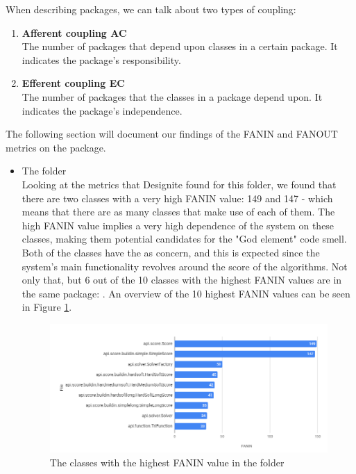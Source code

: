     When describing packages, we can talk about two types of coupling:
    \begin{enumerate}
        \item \textbf{Afferent coupling AC}\\
        The number of packages that depend upon classes in a certain package. It indicates the package's responsibility.
        \item \textbf{Efferent coupling EC}\\
        The number of packages that the classes in a package depend upon. It indicates the package's independence.
    \end{enumerate}
    The following section will document our findings of the FANIN and FANOUT metrics on the  package.
    
    \begin{itemize}
        \item The  folder\\
        Looking at the metrics that Designite found for this folder, we found that there are two classes with a very high FANIN value: 149 and 147 - which means that there are as many classes that make use of each of them. The high FANIN value implies a very high dependence of the system on these classes, making them potential candidates for the "God element" code smell. Both of the classes have the  as concern, and this is expected since the system's main functionality revolves around the score of the algorithms. Not only that, but 6 out of the 10 classes with the highest FANIN values are in the same package: . An overview of the 10 highest FANIN values can be seen in Figure \ref{fig:faninapi}.
        \begin{figure}[H]
            \includegraphics[scale=0.8]{figures/step4/step4.2/FANIN_api.PNG}
            \caption{The classes with the highest FANIN value in the  folder}
            \label{fig:faninapi}

\end{figure}
\end{itemize}
